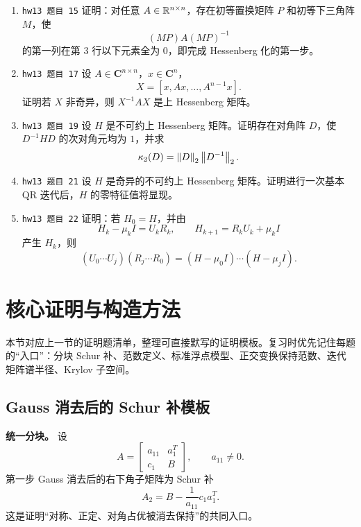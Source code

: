 \documentclass{article}
\begin{document}
\begin{enumerate}
  \item \texttt{hw13 题目 15} 证明：对任意 $A\in\mathbb{R}^{n\times n}$，存在初等置换矩阵 $P$ 和初等下三角阵 $M$，使
  \[
    (MP)A(MP)^{-1}
  \]
  的第一列在第 $3$ 行以下元素全为 $0$，即完成 Hessenberg 化的第一步。

  \item \texttt{hw13 题目 17} 设 $A\in\mathbf C^{n\times n}$，$x\in\mathbf C^n$，
  \[
    X=[x,Ax,\ldots,A^{n-1}x].
  \]
  证明若 $X$ 非奇异，则 $X^{-1}AX$ 是上 Hessenberg 矩阵。

  \item \texttt{hw13 题目 19} 设 $H$ 是不可约上 Hessenberg 矩阵。证明存在对角阵 $D$，使 $D^{-1}HD$ 的次对角元均为 $1$，并求
  \[
    \kappa_2(D)=\left\| D \right\|_2\left\| D^{-1} \right\|_2.
  \]

  \item \texttt{hw13 题目 21} 设 $H$ 是奇异的不可约上 Hessenberg 矩阵。证明进行一次基本 QR 迭代后，$H$ 的零特征值将显现。

  \item \texttt{hw13 题目 22} 证明：若 $H_0=H$，并由
  \[
    H_k-\mu_kI=U_kR_k,\qquad H_{k+1}=R_kU_k+\mu_kI
  \]
  产生 $H_k$，则
  \[
    (U_0\cdots U_j)(R_j\cdots R_0)
    =(H-\mu_0I)\cdots(H-\mu_jI).
  \]
\end{enumerate}

\section{核心证明与构造方法}

\noindent 本节对应上一节的证明题清单，整理可直接默写的证明模板。复习时优先记住每题的“入口”：分块 Schur 补、范数定义、标准浮点模型、正交变换保持范数、迭代矩阵谱半径、Krylov 子空间。

\subsection{Gauss 消去后的 Schur 补模板}

\textbf{统一分块。} 设
\[
  A=\begin{bmatrix}
    a_{11}&a_1^T\\
    c_1&B
  \end{bmatrix},\qquad a_{11}\ne0.
\]
第一步 Gauss 消去后的右下角子矩阵为 Schur 补
\[
  A_2=B-\frac1{a_{11}}c_1a_1^T.
\]
这是证明“对称、正定、对角占优被消去保持”的共同入口。
\end{document}
